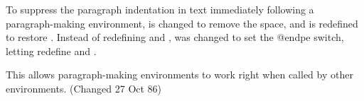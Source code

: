  
 \begin{macro}{\@endparenv}
 \begin{macro}{\@doendpe}
 To suppress the paragraph indentation in text immediately following
 a paragraph-making environment,  is changed to remove the
 space, and  is redefined to restore .  Instead of
 redefining  and ,  was changed to 
 set the @endpe switch, letting  redefine  and 
 .  

 This allows paragraph-making environments to work right when called 
 by other environments. (Changed 27 Oct 86)
    \begin{teX}
\def\@endparenv{%
  \addpenalty\@endparpenalty\addvspace\@topsepadd\@endpetrue}
    \end{teX}

    \begin{teX}
\def\@doendpe{\@endpetrue
     \def\par{\@restorepar\everypar{}\par\@endpefalse}\everypar
    \end{teX}
    
    Use |\setbox0=\lastbox| instead of   |\hskip -\parindent|   
    so that a \cs{noindent} becomes a no-op when used before 
    a line immediately following a list environment(23 Oct 86).
 \changes{v1.0k}{1995/11/07}{Enclosed \cs{setbox0} assignment by a
 group so that it leaves the contents of box $0$ intact.} 
    \begin{teX}
               {{\setbox\z@\lastbox}\everypar{}\@endpefalse}}
    \end{teX}
 \end{macro}
 \end{macro}

 
 \begin{macro}{\if@endpe}
 \begin{macro}{\@endpefalse}
 \begin{macro}{\@endpeltrue}
    \begin{teX}
\newif\if@endpe
\@endpefalse
    \end{teX}
 \end{macro}\end{macro}\end{macro}

 
 \begin{macro}{\@mklab}
    \begin{teX}
\def\@mklab#1{\hfil #1}
    \end{teX}
 \end{macro}

